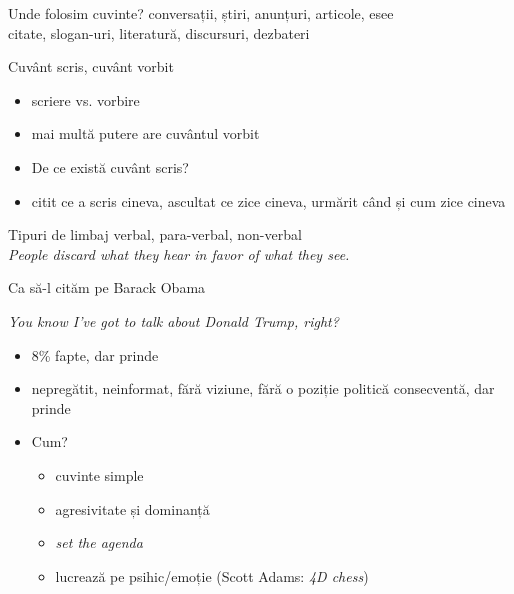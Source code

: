 \documentclass{beamer}
\begin{document}
\begin{frame}{Unde folosim cuvinte?}
  \centering
  \pause
  conversații, știri, anunțuri, articole, esee\\
  \pause
  \vspace{1cm}
  citate, slogan-uri, literatură, discursuri, dezbateri
\end{frame}

\begin{frame}{Cuvânt scris, cuvânt vorbit}
  \begin{itemize}
    \pause
    \item scriere vs. vorbire
    \pause
    \item mai multă putere are cuvântul vorbit
    \pause
    \item De ce există cuvânt scris?
    \pause
    \item citit ce a scris cineva, ascultat ce zice cineva, urmărit când și cum zice cineva
  \end{itemize}
\end{frame}

\begin{frame}{Tipuri de limbaj}
  \centering
  \pause
  verbal, para-verbal, non-verbal\\
  \pause
  \vspace{0.5cm}
  \textit{People discard what they hear in favor of what they see.}
\end{frame}

\begin{frame}{Ca să-l cităm pe Barack Obama}
  \pause
  \begin{center}
    \textit{You know I've got to talk about Donald Trump, right?}
  \end{center}
  \begin{itemize}
    \pause
    \item 8\% fapte, dar prinde
    \pause
    \item nepregătit, neinformat, fără viziune, fără o poziție politică consecventă, dar prinde
    \pause
    \item Cum?
      \begin{itemize}
        \pause
        \item cuvinte simple
        \pause
        \item agresivitate și dominanță
        \pause
        \item \textit{set the agenda}
        \pause
        \item lucrează pe psihic/emoție (Scott Adams: \textit{4D chess})
      \end{itemize}
  \end{itemize}
\end{frame}
\end{document}
